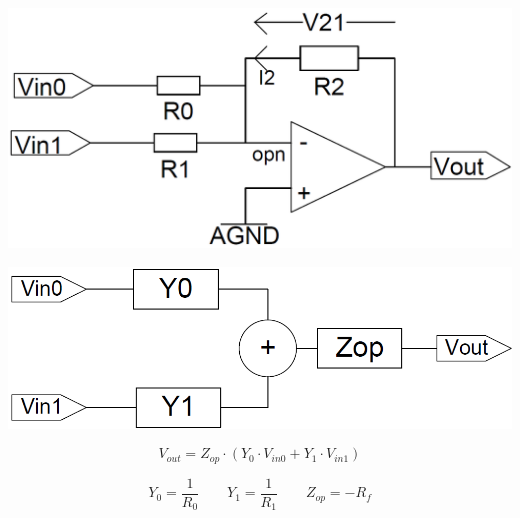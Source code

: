 
\begin{minipage}[c]{0.4\columnwidth}
    \includegraphics[width=\columnwidth]{images/summierender_verstaerker.png}
\end{minipage}
\hfill
\begin{minipage}[c]{0.58\columnwidth}
    \begin{center}
        \includegraphics[width=0.8\columnwidth]{images/summierender_verstaerker_sfd.png}
    \end{center}
    $$ V_{out} = Z_{op} \cdot (Y_0 \cdot V_{in0} + Y_1 \cdot V_{in1}) $$
\end{minipage}

$$ Y_0 = \frac{1}{R_0} \qquad Y_1 = \frac{1}{R_1} \qquad Z_{op} = - R_f $$



